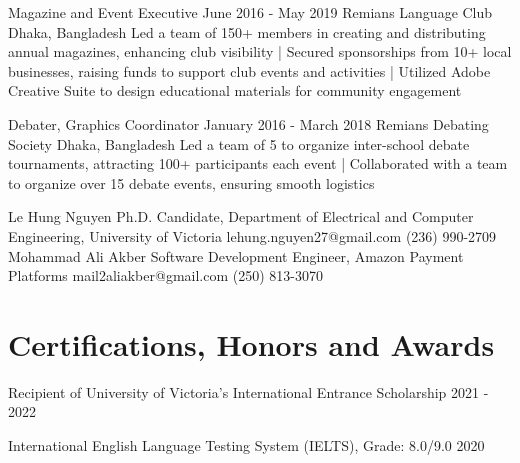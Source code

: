 \documentclass[a4paper,10pt]{article}
\begin{document}
\relevantexperience
{Magazine and Event Executive}
{June 2016 - May 2019}
{Remians Language Club}
{Dhaka, Bangladesh}
{Led a team of 150+ members in creating and distributing annual magazines, enhancing club visibility
| Secured sponsorships from 10+ local businesses, raising funds to support club events and activities 
| Utilized Adobe Creative Suite to design educational materials for community engagement
}

\relevantexperience
{Debater, Graphics Coordinator}
{January 2016 - March 2018}
{Remians Debating Society}
{Dhaka, Bangladesh}
{Led a team of 5 to organize inter-school debate tournaments, attracting 100+ participants each event
| Collaborated with a team to organize over 15 debate events, ensuring smooth logistics 
}

\begin{references}
        {Le Hung Nguyen}
        {Ph.D. Candidate, Department of Electrical and}
        {Computer Engineering, University of Victoria}
        {lehung.nguyen27@gmail.com}
        {(236) 990-2709}
    \hfill
        {Mohammad Ali Akber}
        {Software Development Engineer,}
        {Amazon Payment Platforms}
        {mail2aliakber@gmail.com}
        {(250) 813-3070}
\end{references}

\section{Certifications, Honors and Awards}
\honorsawards
{Recipient of University of Victoria’s International Entrance Scholarship}
{2021 - 2022}

\honorsawards
{International English Language Testing System (IELTS), Grade: 8.0/9.0}
{2020}
\end{document}
